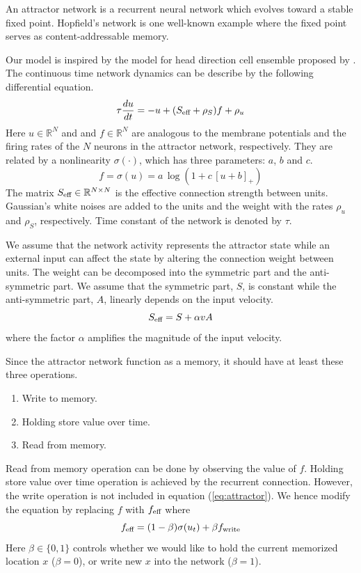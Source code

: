 An attractor network is a recurrent neural network which evolves toward a stable fixed point. Hopfield's network \cite{hj82} is one well-known example where the fixed point serves as content-addressable memory.

Our model is inspired by the model for head direction cell ensemble proposed by \textcite{zk96}. The continuous time network dynamics can be describe by the following differential equation.
\begin{equation}
\label{eq:attractor}
\tau\frac{du}{dt} =
	-u + (S_{\text{\scriptsize{eff}}} + \rho_S)f + \rho_u
\end{equation}
Here $u \in \mathbb{R}^N$ and and $f \in \mathbb{R}^N$ are analogous to the membrane potentials and the firing rates of the $N$ neurons in the attractor network, respectively. They are related by a nonlinearity $\sigma(\cdot)$, which has three parameters: $a$, $b$ and $c$.
\begin{equation}
f = \sigma(u) = a\,\log(1 + c\,[u + b]_+)
\end{equation}
The matrix $S_{\text{\scriptsize{eff}}} \in \mathbb{R}^{N \times N}$ is the effective connection strength between units. Gaussian's white noises are added to the units and the weight with the rates $\rho_u$ and $\rho_S$, respectively. Time constant of the network is denoted by $\tau$.

We assume that the network activity represents the attractor state while an external input can affect the state by altering the connection weight between units. The weight can be decomposed into the symmetric part and the anti-symmetric part. We assume that the symmetric part, $S$, is constant while the anti-symmetric part, $A$, linearly depends on the input velocity.
\begin{equation}
S_{\text{\scriptsize{eff}}} = S + \alpha v A
\end{equation}
where the factor $\alpha$ amplifies the magnitude of the input velocity.

Since the attractor network function as a memory, it should have at least these three operations.
\begin{enumerate}
    \item Write to memory.
    \item Holding store value over time.
    \item Read from memory.
\end{enumerate}
Read from memory operation can be done by observing the value of $f$. Holding store value over time operation is achieved by the recurrent connection. However, the write operation is not included in equation (\ref{eq:attractor}). We hence modify the equation by replacing $f$ with $f_{\text{\scriptsize{eff}}}$ where
\begin{equation}
f_{\text{\scriptsize{eff}}} =
	(1 - \beta)\sigma(u_t) + \beta f_{\text{\scriptsize{write}}}
\end{equation}
Here $\beta \in \{0, 1\}$ controls whether we would like to hold the current memorized location $x$ ($\beta = 0$), or write new $x$ into the network ($\beta = 1$).

